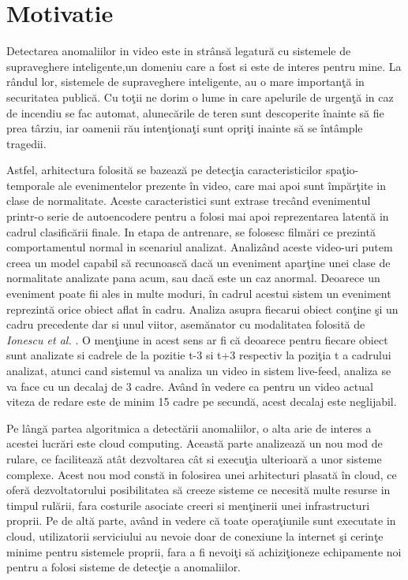 \documentclass[a4paper,12pt]{report}
\begin{document}
\section{Motivatie}
\quad Detectarea anomaliilor in video este in strânsă legatură cu sistemele de supraveghere inteligente,un domeniu care a fost si este de interes pentru mine. La rândul lor, sistemele de supraveghere inteligente, au o mare importanţă in securitatea publică. Cu toţii ne dorim o lume in care apelurile de urgenţă in caz de incendiu se fac automat, alunecările de teren sunt descoperite înainte să fie prea târziu, iar oamenii rău intenţionaţi sunt opriţi inainte să se întâmple tragedii. 
\par
Astfel, arhitectura folosită se bazează pe detecţia caracteristicilor spaţio-temporale ale evenimentelor prezente în video, care mai apoi sunt împărţite in clase de normalitate. Aceste caracteristici sunt extrase trecând evenimentul printr-o serie de autoencodere pentru a folosi mai apoi reprezentarea latentă in cadrul clasificării finale. In etapa de antrenare, se folosesc filmări ce prezintă comportamentul normal in scenariul analizat. Analizând aceste video-uri putem creea un model capabil să recunoască dacă un eveniment aparţine unei clase de normalitate analizate pana acum, sau dacă este un caz anormal. Deoarece un eveniment poate fii ales in multe moduri, în cadrul acestui sistem un eveniment reprezintă orice obiect aflat în cadru. Analiza asupra fiecarui obiect conţine şi un cadru precedente dar si unul viitor, asemănator cu modalitatea folosită de \emph{Ionescu et al.}  \cite{ionescu2019object}. O menţiune in acest sens ar fi că deoarece pentru fiecare obiect sunt analizate si cadrele de la pozitie t-3 si t+3  respectiv la poziţia t a cadrului analizat, atunci cand sistemul va analiza un video in sistem live-feed, analiza se va face cu un decalaj de 3 cadre. Având în vedere ca pentru un video actual viteza de redare este de minim 15 cadre pe secundă, acest decalaj este neglijabil.
\par
Pe lângă partea algoritmica a detectării anomaliilor, o alta arie de interes a acestei lucrări este cloud computing. Această parte analizează un nou mod de rulare, ce facilitează atât dezvoltarea cât si execuţia ulterioară a unor sisteme complexe. Acest nou mod constă in folosirea unei arhitecturi plasată în cloud, ce oferă dezvoltatorului posibilitatea să creeze sisteme ce necesită multe resurse in timpul rulării, fara costurile asociate creeri si menţinerii unei infrastructuri proprii. Pe de altă parte, având in vedere că toate operaţiunile sunt executate in cloud, utilizatorii serviciului au nevoie doar de conexiune la internet şi cerinţe minime pentru sistemele proprii, fara a fi nevoiţi să achiziţioneze echipamente noi pentru a folosi sisteme de detecţie a anomaliilor.
\end{document}
